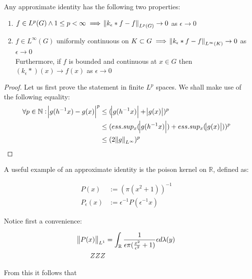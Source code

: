 \begin{theorem}
Any approximate identity has the following two properties:
\begin{enumerate}
\item $f \in L^p(G) \wedge 1 \leq p < \infty \implies \norm{k_\epsilon \ast f - f}_{L^p(G)} \to 0 $ as $ \epsilon \to 0$
\item $f \in L^\infty(G)$ uniformly continuous on $K \subset G \implies \norm{k_\epsilon \ast f - f}_{L^\infty(K)} \to 0$ as $\epsilon \to 0$ \\
Furthermore, if $f$ is bounded and continuous at $x \in G$ then
$ (k_\epsilon \ast )(x) \to f(x) $ as $\epsilon \to 0$ 
\end{enumerate}
\end{theorem}

\begin{proof}
Let us first prove the statement in finite $L^p$ spaces. We shall make use of the following equality:
\begin{align*}
\forall p \in \mathbb{N} : \abs{g(h^{-1}x) - g(x)}^p &\leq (\abs{g(h^{-1}x)}+\abs{g(x)})^p \\
&\leq (ess.sup_x (\abs{g(h^{-1}x)} )+ess.sup_x(\abs{g(x)}) )^p \\
&\leq (2\norm{g}_{L^\infty})^p

\end{align*}
\end{proof}

\begin{example}

A useful example of an approximate identity is the poison kernel on $\mathbb{R}$, defined as:

\begin{align*}
P(x) &:= (\pi(x^2+1))^{-1} \\
P_\epsilon(x) &:= \epsilon^{-1}P(\epsilon^{-1}x)
\end{align*}

Notice first a convenience:

\begin{align*}
\norm{P(x)}_{L^1} &= \int_\mathbb{R} \frac{1}{\epsilon \pi (\frac{x^2}{\epsilon^2}+1)} \epsilon d\lambda(y) \\
ZZZ
\end{align*}

From this it follows that 

\end{example}

